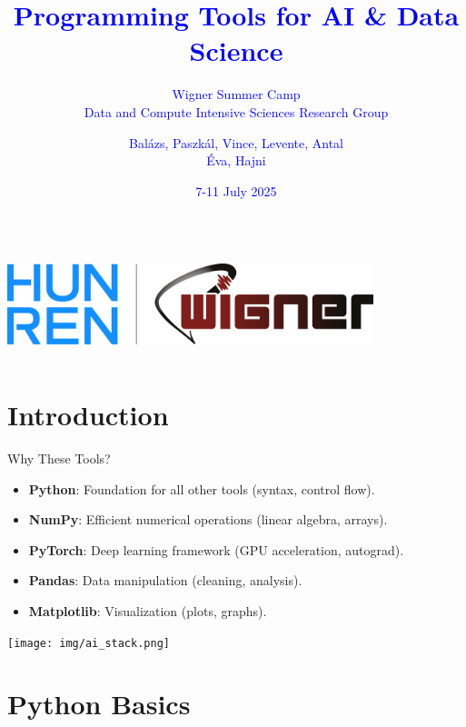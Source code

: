 \documentclass{beamer}
\title{\textcolor{blue}{Programming Tools for AI \& Data Science}}
\subtitle{\textcolor{blue}{Wigner Summer Camp \\ Data and Compute Intensive Sciences Research Group}}
\author{\textcolor{blue}{Balázs, Paszkál, Vince, Levente, Antal \\ Éva, Hajni}}
\date{\textcolor{blue}{7-11 July 2025}}
\begin{document}
\begin{frame}
  \titlepage
  \begin{columns}
    \centering
    \includegraphics[width=0.8\textwidth]{img/logo.png}
  \end{columns}
\end{frame}

\section{Introduction}

\begin{frame}{Why These Tools?}
  \begin{itemize}
    \item \textbf{Python}: Foundation for all other tools (syntax, control flow).
    \item \textbf{NumPy}: Efficient numerical operations (linear algebra, arrays).
    \item \textbf{PyTorch}: Deep learning framework (GPU acceleration, autograd).
    \item \textbf{Pandas}: Data manipulation (cleaning, analysis).
    \item \textbf{Matplotlib}: Visualization (plots, graphs).
  \end{itemize}
  \vspace{1em}
  \centering
  \texttt{[image: img/ai\_stack.png]}  %
\end{frame}

\section{Python Basics}
\end{document}
